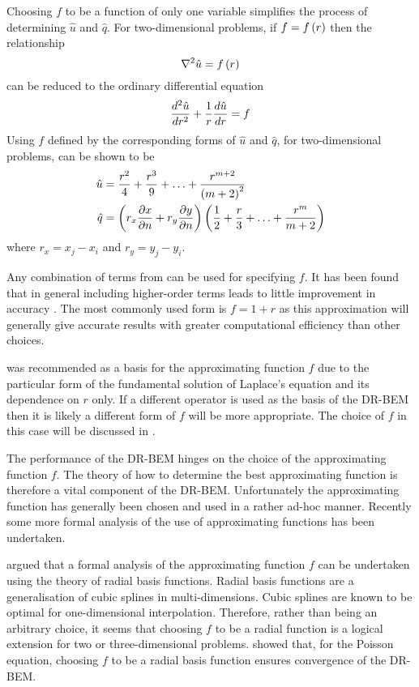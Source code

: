 Choosing $f$ to be a function of only one variable simplifies the process
of determining $\hat{u}$ and $\hat{q}$.  For two-dimensional problems, if $f
=  f\left( r \right) $ then the relationship
\begin{equation}
  \laplacian{}{\hat{u}} = \fnof{f}{r} 
\end{equation}
can be reduced to the ordinary differential equation
\begin{equation}
   \dfrac{ d^{2} \hat{u}}{d {r}^{2}}  + \dfrac{1}{r}  \dfrac{ d \hat{u}}{d r}  = f 
\end{equation}
Using $f$ defined by  the corresponding forms of $\hat{u}$
and $\hat{q}$, for two-dimensional problems, can be shown to be
\begin{align}
  \hat{u} & = \dfrac{r^{2}}{4} + \dfrac{r^{3}}{9} + \ldots +
  \dfrac{r^{m+2}}{\left( m+2 \right)^{2}} \\ \hat{q} & = \left( r_{x}  \dfrac{\partial x}{\partial n}  +
    r_{y}  \dfrac{\partial y}{\partial n}  \right) \left( \dfrac{1}{2} + \dfrac{r}{3} +\ldots+
    \dfrac{r^{m}}{m+2} \right)
\end{align}
where $r_{x} = x_{j} - x_{i}$ and $r_{y} = y_{j} - y_{i}$.

Any combination of terms from  can be used for specifying
$f$. It has been found that in general including higher-order terms leads
to little improvement in accuracy \citep{partridge:1992}. The most commonly
used form is $f = 1 + r$ as this approximation will generally give accurate
results with greater computational efficiency than other choices.

 was recommended as a basis for the approximating function
$f$ due to the particular form of the fundamental solution of Laplace's
equation and its dependence on $r$ only. If a different operator is used as
the basis of the DR-BEM then it is likely a different form of $f$ will be
more appropriate.  The choice of $f$ in this case will be discussed in
.

The performance of the DR-BEM hinges on the choice of the approximating
function $f$.  The theory of how to determine the best approximating
function is therefore a vital component of the DR-BEM.  Unfortunately the
approximating function has generally been chosen and used in a rather
ad-hoc manner.  Recently some more formal analysis of the use of
approximating functions has been undertaken. 

\citet{golberg:1994} argued that a formal analysis of the approximating
function $f$ can be undertaken using the theory of radial basis functions.
Radial basis functions are a generalisation of cubic splines in
multi-dimensions.  Cubic splines are known to be optimal for one-dimensional
interpolation.  Therefore, rather than being an arbitrary choice, it seems
that choosing $f$ to be a radial function is a logical extension for two
or three-dimensional problems.  \citet{golberg:1994} showed that, for the
Poisson equation, choosing $f$ to be a radial basis function ensures
convergence of the DR-BEM.

